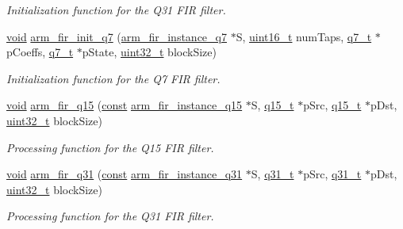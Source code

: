 \begin{DoxyCompactItemize}
\begin{DoxyCompactList}\small\item\em Initialization function for the Q31 F\-I\-R filter. \end{DoxyCompactList}\item 
\hyperlink{group___n_a_m_e_ga18028b8badbf1ea7e704ccac3c488e82}{void} \hyperlink{group___f_i_r_ga88e48688224d42dc173dbcec702f0c1d}{arm\-\_\-fir\-\_\-init\-\_\-q7} (\hyperlink{structarm__fir__instance__q7}{arm\-\_\-fir\-\_\-instance\-\_\-q7} $\ast$S, \hyperlink{stdint_8h_a273cf69d639a59973b6019625df33e30}{uint16\-\_\-t} num\-Taps, \hyperlink{arm__math_8h_ae541b6f232c305361e9b416fc9eed263}{q7\-\_\-t} $\ast$p\-Coeffs, \hyperlink{arm__math_8h_ae541b6f232c305361e9b416fc9eed263}{q7\-\_\-t} $\ast$p\-State, \hyperlink{stdint_8h_a435d1572bf3f880d55459d9805097f62}{uint32\-\_\-t} block\-Size)
\begin{DoxyCompactList}\small\item\em Initialization function for the Q7 F\-I\-R filter. \end{DoxyCompactList}\item 
\hyperlink{group___n_a_m_e_ga18028b8badbf1ea7e704ccac3c488e82}{void} \hyperlink{group___f_i_r_ga262d173058d6f80fdf60404ba262a8f5}{arm\-\_\-fir\-\_\-q15} (\hyperlink{group___n_a_m_e_ga7ae6d0e43244213b34de2c2b9aa30da6}{const} \hyperlink{structarm__fir__instance__q15}{arm\-\_\-fir\-\_\-instance\-\_\-q15} $\ast$S, \hyperlink{arm__math_8h_ab5a8fb21a5b3b983d5f54f31614052ea}{q15\-\_\-t} $\ast$p\-Src, \hyperlink{arm__math_8h_ab5a8fb21a5b3b983d5f54f31614052ea}{q15\-\_\-t} $\ast$p\-Dst, \hyperlink{stdint_8h_a435d1572bf3f880d55459d9805097f62}{uint32\-\_\-t} block\-Size)
\begin{DoxyCompactList}\small\item\em Processing function for the Q15 F\-I\-R filter. \end{DoxyCompactList}\item 
\hyperlink{group___n_a_m_e_ga18028b8badbf1ea7e704ccac3c488e82}{void} \hyperlink{group___f_i_r_gaadd938c68ab08967cbb5fc696f384bb5}{arm\-\_\-fir\-\_\-q31} (\hyperlink{group___n_a_m_e_ga7ae6d0e43244213b34de2c2b9aa30da6}{const} \hyperlink{structarm__fir__instance__q31}{arm\-\_\-fir\-\_\-instance\-\_\-q31} $\ast$S, \hyperlink{arm__math_8h_adc89a3547f5324b7b3b95adec3806bc0}{q31\-\_\-t} $\ast$p\-Src, \hyperlink{arm__math_8h_adc89a3547f5324b7b3b95adec3806bc0}{q31\-\_\-t} $\ast$p\-Dst, \hyperlink{stdint_8h_a435d1572bf3f880d55459d9805097f62}{uint32\-\_\-t} block\-Size)
\begin{DoxyCompactList}\small\item\em Processing function for the Q31 F\-I\-R filter. \end{DoxyCompactList}\item 

\end{DoxyCompactItemize}
